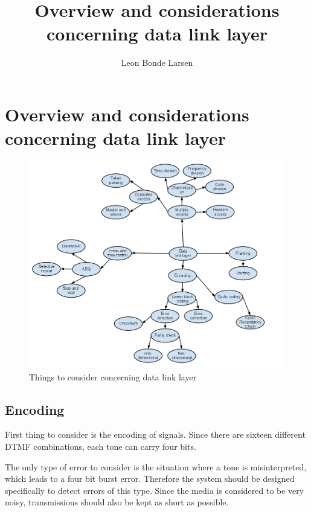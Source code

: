 \documentclass[letterpaper]{article}
\author{Leon Bonde Larsen}
\title{Overview and considerations concerning data link layer}
\begin{document}
\setlength{\baselineskip}{1.6\baselineskip}
\setlength{\parskip}{2ex}
\maketitle

\section{Overview and considerations concerning data link layer}

\begin{figure}[htb]
	\begin{center}
	\includegraphics[scale=0.5,trim=0 0 0 0]{content/graphics/dll_bobler.png}
	\caption{Things to consider concerning data link layer}
	\label{Things to consider concerning data link layer}
	\end{center}
\end{figure}

\subsection{Encoding}
First thing to consider is the encoding of signals. Since there are sixteen
different DTMF combinations, each tone can carry four bits.

The only type of error to consider is the situation where a tone is
misinterpreted, which leads to a four bit burst error. Therefore the system
should be designed specifically to detect errors of this type. Since the media
is considered to be very noisy, transmissions should also be kept as short as
possible.
\end{document}

